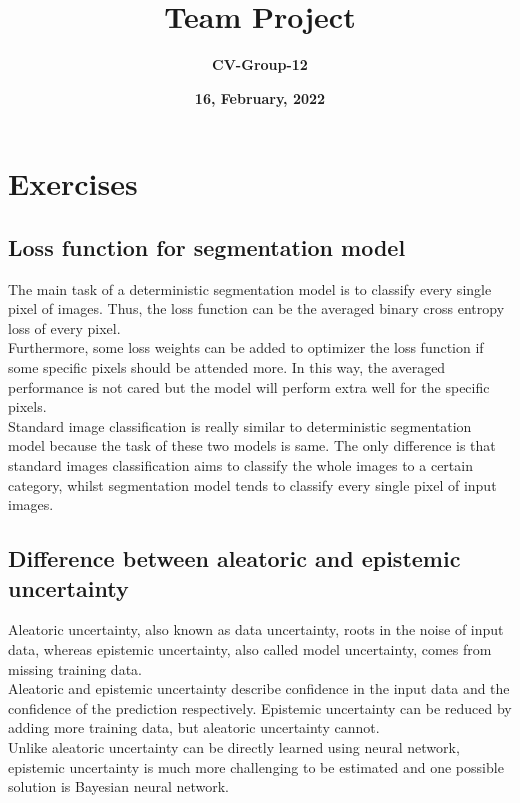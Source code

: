 \documentclass[11pt]{article} %
\title{\Huge \bf Team Project}
\author{\Huge \bf CV-Group-12}
\date{\Huge \bf 16, February, 2022}
\begin{document}
	\maketitle
	\newpage
	\section{Exercises}
	\subsection{Loss function for segmentation model}
	The main task of a deterministic segmentation model is to classify every single pixel of images. Thus, the loss function can be the averaged binary cross entropy loss of every pixel. \\
	
	Furthermore, some loss weights can be added to optimizer the loss function if some specific pixels should be attended more. In this way, the averaged performance is not cared but the model will perform extra well for the specific pixels.\\
	
	Standard image classification is really similar to deterministic segmentation model because the task of these two models is same. The only difference is that standard images classification aims to classify the whole images to a certain category, whilst segmentation model tends to classify every single pixel of input images.   
	
		
	
	\subsection{Difference between aleatoric and epistemic uncertainty}
	Aleatoric uncertainty, also known as data uncertainty, roots in the noise of input data, whereas epistemic uncertainty, also called model uncertainty, comes from missing training data.\\
	
	 Aleatoric and epistemic uncertainty describe confidence in the input data and the confidence of the prediction respectively. Epistemic uncertainty can be reduced by adding more training data, but aleatoric uncertainty cannot. \\
	 
	 Unlike aleatoric uncertainty can be directly learned using neural network, epistemic uncertainty is much more challenging to be estimated and one possible solution is Bayesian neural network. 
\end{document}
